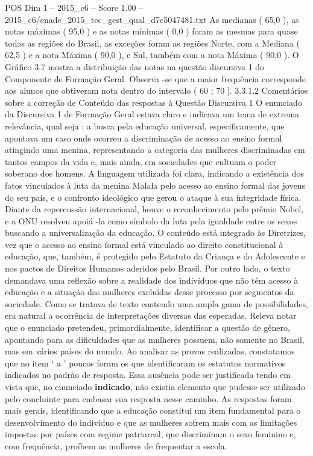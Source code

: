 \begin{textsample}{POS Dim 1 – 2015\_c6 – Score 1.00 – 2015\_c6/enade\_2015\_tec\_gest\_qual\_d7c5047481.txt}
As medianas ( 65,0 ), as notas máximas ( 95,0 ) e as notas mínimas ( 0,0 ) foram as mesmas para quase todas as regiões do Brasil, as exceções foram as regiões Norte, com a Mediana ( 62,5 ) e a nota Máxima ( 90,0 ), e Sul, também com a nota Máxima ( 90,0 ).
O Gráfico 3.7 mostra a distribuição das notas na questão discursiva 1 do Componente de Formação Geral.
Observa -se que a maior frequência corresponde aos alunos que obtiveram nota dentro do intervalo ( 60 ; 70 ]. 3.3.1.2 Comentários sobre a correção de Conteúdo das respostas à Questão Discursiva 1 O enunciado da Discursiva 1 de Formação Geral estava claro e indicava um tema de extrema relevância, qual seja : a busca pela educação universal, especificamente, que apontava um caso onde ocorreu a discriminação de acesso ao ensino formal atingindo uma menina, representando a categoria das mulheres discriminadas em tantos campos da vida e, mais ainda, em sociedades que cultuam o poder soberano dos homens.
A linguagem utilizada foi clara, indicando a existência dos fatos vinculados à luta da menina Malala pelo acesso ao ensino formal das jovens do seu país, e o confronto ideológico que gerou o ataque à sua integridade física.
Diante da repercussão internacional, houve o reconhecimento pelo prêmio Nobel, e a ONU resolveu apoiá -la como símbolo da luta pela igualdade entre os sexos buscando a universalização da educação.
O conteúdo está integrado às Diretrizes, vez que o acesso ao ensino formal está vinculado ao direito constitucional à educação, que, também, é protegido pelo Estatuto da Criança e do Adolescente e nos pactos de Direitos Humanos aderidos pelo Brasil.
Por outro lado, o texto demandava uma reflexão sobre a realidade dos indivíduos que não têm acesso à educação e a situação das mulheres excluídas desse processo por segmentos da sociedade.
Como se tratava de texto contendo uma ampla gama de possibilidades, era natural a ocorrência de interpretações diversas das esperadas.
Releva notar que o enunciado pretendeu, primordialmente, identificar a questão de gênero, apontando para as dificuldades que as mulheres possuem, não somente no Brasil, mas em vários países do mundo.
Ao analisar as provas realizadas, constatamos que no item ‘ a ’ poucos foram os que identificaram os estatutos normativos indicados no padrão de resposta.
Essa ausência pode ser justificada tendo em vista que, no enunciado \textbf{indicado}, não existia elemento que pudesse ser utilizado pelo concluinte para embasar sua resposta nesse caminho.
As respostas foram mais gerais, identificando que a educação constitui um item fundamental para o desenvolvimento do indivíduo e que as mulheres sofrem mais com as limitações impostas por países com regime patriarcal, que discriminam o sexo feminino e, com frequência, proíbem as mulheres de frequentar a escola.

\end{textsample}
